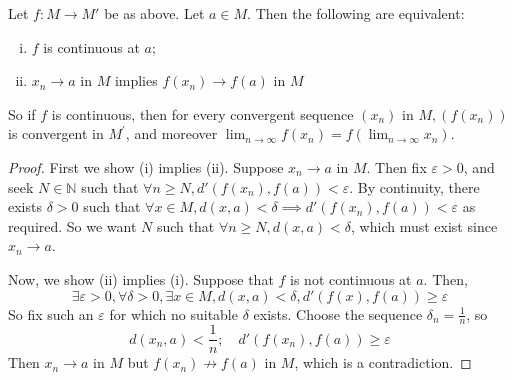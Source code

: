 \documentclass[a4paper,11pt]{article}
\begin{document}
\begin{proposition}
	Let \( f \colon M \to M' \) be as above.
	Let \( a \in M \).
	Then the following are equivalent:
	\begin{enumerate}[(i)]
		\item \( f \) is continuous at \( a \);
		\item \( x_n \to a \) in \( M \) implies \( f(x_n) \to f(a) \) in \( M \)
	\end{enumerate}
    So if $f$ is continuous, then for every convergent sequence $\left(x_n\right)$ in $M,\left(f\left(x_n\right)\right)$ is convergent in $M^{\prime}$, and moreover $\lim _{n \rightarrow \infty} f\left(x_n\right)=f\left(\lim _{n \rightarrow \infty} x_n\right)$.
\end{proposition}
\begin{proof}
	First we show (i) implies (ii).
	Suppose \( x_n \to a \) in \( M \).
	Then fix \( \varepsilon > 0 \), and seek \( N \in \mathbb N \) such that \( \forall n \geq N, d'(f(x_n), f(a)) < \varepsilon \).
	By continuity, there exists \( \delta > 0 \) such that \( \forall x \in M, d(x,a) < \delta \implies d'(f(x_n), f(a)) < \varepsilon \) as required.
	So we want \( N \) such that \( \forall n \geq N, d(x,a) < \delta \), which must exist since \( x_n \to a \).

	Now, we show (ii) implies (i).
	Suppose that \( f \) is not continuous at \( a \).
	Then,
	\[
		\exists \varepsilon > 0, \forall \delta > 0, \exists x \in M, d(x,a) < \delta, d'(f(x), f(a)) \geq \varepsilon
	\]
	So fix such an \( \varepsilon \) for which no suitable \( \delta \) exists.
	Choose the sequence \( \delta_n = \frac{1}{n} \), so
	\[
		d(x_n,a) < \frac{1}{n};\quad d'(f(x_n), f(a)) \geq \varepsilon
	\]
	Then \( x_n \to a \) in \( M \) but \( f(x_n) \not\to f(a) \) in \( M \), which is a contradiction.
\end{proof}
\end{document}
